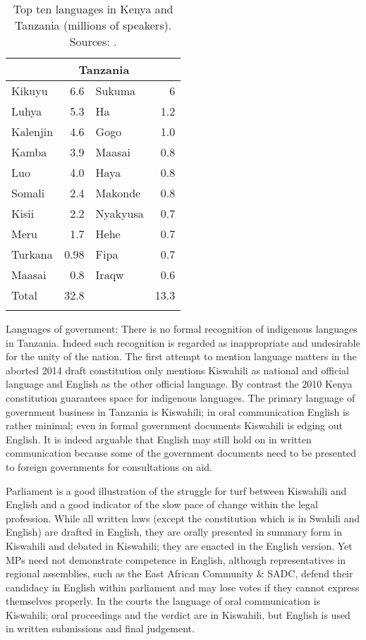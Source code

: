 \documentclass[output=paper,colorlinks,citecolor=brown]{langscibook}
\begin{document}
\begin{table}
    \begin{tabular}{lrlr}
    \lsptoprule
    \multicolumn{2}{c}{Kenya} & \multicolumn{2}{c}{Tanzania}\\
        \midrule
         Kikuyu & 6.6 &  Sukuma & 6 \\
          Luhya & 5.3 & Ha & 1.2 \\
          Kalenjin & 4.6  & Gogo & 1.0 \\
          Kamba & 3.9 & Maasai & 0.8 \\
          Luo & 4.0 & Haya & 0.8 \\
          Somali & 2.4 & Makonde & 0.8 \\
          Kisii & 2.2 & Nyakyusa & 0.7 \\
          Meru & 1.7 & Hehe & 0.7 \\
          Turkana & 0.98 & Fipa & 0.7 \\
          Maasai & 0.8 & Iraqw & 0.6 \\
        \midrule
    {Total} & {32.8} &  & {13.3} \\
    \lspbottomrule
    \end{tabular}
    \caption{Top ten languages in Kenya and Tanzania (millions of speakers). Sources: \cite{Kenya-National-Bureau-of-Statistics2009, Mradi-wa-Lugha-za-Tanzania2009}.\label{tab:kioko:1}}
\end{table}

Languages of government: There is no formal recognition of indigenous languages in Tanzania. Indeed such recognition is regarded as inappropriate and undesirable for the unity of the nation. The first attempt to mention language matters in the aborted 2014 draft constitution only mentions Kiswahili as national and official language and English as the other official language. By contrast the 2010 Kenya constitution guarantees space for indigenous languages. The primary language of government business in Tanzania is Kiswahili; in oral communication English is rather minimal; even in formal government documents Kiswahili is edging out English. It is indeed arguable that English may still hold on in written communication because some of the government documents need to be presented to foreign governments for consultations on aid.  

Parliament is a good illustration of the struggle for turf between Kiswahili and English and a good indicator of the slow pace of change within the legal profession.  While all written laws (except the constitution which is in Swahili and English) are drafted in English, they are orally presented in summary form in Kiswahili and debated in Kiswahili; they are enacted in the English version. Yet MPs need not demonstrate competence in English, although representatives in regional assemblies, such as the East African Community \& SADC, defend their candidacy in English within parliament and may lose votes if they cannot express themselves properly. In the courts the language of oral communication is Kiswahili; oral proceedings and the verdict are in Kiswahili, but English is used in written submissions and final judgement.
\end{document}
